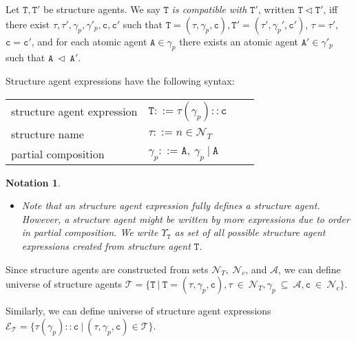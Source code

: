 \documentclass{entcs}
\renewcommand{\~}[0]{\texttildelow}
\newcommand{\choice}{|}
\newtheorem{notation}[thm]{Notation}
\begin{document}
\begin{defn}
Let $\mathtt{T},\mathtt{T}'$ be structure agents. We say $\mathtt{T}$ \emph{is compatible with} $\mathtt{T}'$, written $\mathtt{T} \lhd \mathtt{T}'$, iff there exist $\tau,\tau',\gamma_p,\gamma'_p,\mathtt{c},\mathtt{c}'$ such that $\mathtt{T}=(\tau, \gamma_p, \mathtt{c}),\mathtt{T}'=(\tau', \gamma_p', \mathtt{c}')$, $\tau = \tau'$, $\mathtt{c} = \mathtt{c}'$, and for each atomic agent $\mathtt{A} \in \gamma_p$ there exists an atomic agent $\mathtt{A}' \in \gamma'_p$ such that $\mathtt{A}~\lhd~\mathtt{A}'$. 
\end{defn}

Structure agent expressions have the following syntax:

\begin{center}
{\small
\hspace*{-1cm}\begin{tabular}{ ll ll }
 structure agent expression & $\mathtt{T} ::= \tau(\gamma_p)::\mathtt{c}$\\
 structure name & $\tau ::= n \in \mathcal{N}_{T}$\\
 partial composition & $\gamma_p ::= \mathtt{A},~\gamma_p~\choice~\mathtt{A}$\\
\end{tabular}
}
\end{center}   

\begin{notation}
~
\begin{itemize}
\item Note that an structure agent expression fully defines a structure agent. However, a structure agent might be written by more expressions due to order in partial composition. We write $\Upsilon_\mathtt{T}$ as set of all possible structure agent expressions created from structure agent $\mathtt{T}$.
\end{itemize}
\end{notation}

\begin{theorem}
Since structure agents are constructed from sets $\mathcal{N}_{T},~\mathcal{N}_{c}$, and $\mathcal{A}$, we can define universe of structure agents $\mathcal{T} = \{ \mathtt{T}~|~\mathtt{T} = (\tau, \gamma_p, \mathtt{c}), \tau~\in~\mathcal{N}_{T}, \gamma_p~\subseteq~\mathcal{A},  \mathtt{c}~\in~\mathcal{N}_{c} \}$.

\noindent Similarly, we can define universe of structure agent expressions\\ $\mathcal{E}_\mathcal{T} = \{ \tau(\gamma_p)::\mathtt{c} ~|~ (\tau, \gamma_p, \mathtt{c}) \in \mathcal{T} \}$.
\end{theorem}
\end{document}
